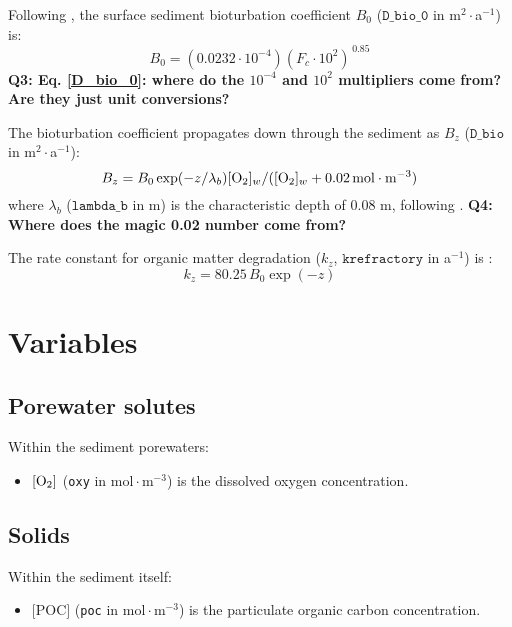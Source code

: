 \documentclass[a4paper]{article}
\newcommand{\code}[1]{\texttt{#1}}
\newcommand{\molmmm}{\mathrm{mol}\cdot\mathrm{m}^{-3}}
\newcommand{\wtf}[1]{\textcolor{Cerulean}{\textbf{#1}}}
\begin{document}
Following \citet{archer_model_2002}, the surface sediment bioturbation coefficient $B_0$ ($\code{D\_bio\_0}$ in m$^2\cdot$a$^{-1}$) is:
\begin{equation}\label{D_bio_0}
B_0 = (0.0232 \cdot 10^{-4}) (F_c \cdot 10^2)^{\,0.85}
\end{equation}
\wtf{Q3: Eq. \eqref{D_bio_0}: where do the $10^{-4}$ and $10^2$ multipliers come from? Are they just unit conversions?}

The bioturbation coefficient propagates down through the sediment as $B_z$ ($\code{D\_bio}$ in m$^2\cdot$a$^{-1}$):
\begin{equation}\label{B_z}
B_z = B_0 \exp(-z/\lambda_b) [\ce{O2}]_w / ([\ce{O2}]_w + 0.02 \, \molmmm)
\end{equation}
where $\lambda_b$ ($\code{lambda\_b}$ in m) is the characteristic depth of 0.08 m, following \citet{sayles_benthic_2001}. \wtf{Q4: Where does the magic 0.02 number come from?}

The rate constant for organic matter degradation ($k_z$, $\code{krefractory}$ in a$^{-1}$) is \citep{archer_model_2002}:
\begin{equation}\label{k_poc_degradation}
k_z = 80.25 \, B_0 \exp(-z)
\end{equation}

\section{Variables}

\subsection{Porewater solutes}

Within the sediment porewaters:
\begin{itemize}
  \item $[\ce{O2}]$ (\code{oxy} in $\molmmm$) is the dissolved oxygen concentration.
\end{itemize}

\subsection{Solids}

Within the sediment itself:
\begin{itemize}
  \item $[$POC$]$ (\code{poc} in $\molmmm$) is the particulate organic carbon concentration.
\end{itemize}
\end{document}
